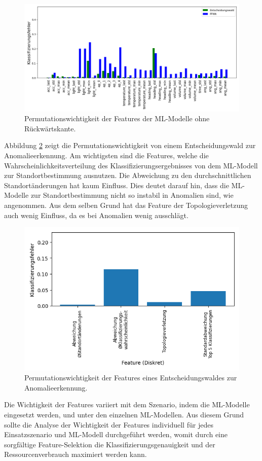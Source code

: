 \begin{figure}[h!]
    \centering
    \includegraphics[width=\linewidth]{images/fi_consolidated_wo_fb.png}
    \caption{Permutationswichtigkeit der Features der ML-Modelle ohne Rückwärtskante.}
    \label{fig:fi_consolidated_wo_fb}
\end{figure}
\newline
\newline
Abbildung \ref{fig:feature_significance_dt_anomaly} zeigt die Permutationswichtigkeit von einem Entscheidungswald zur Anomalieerkennung.
Am wichtigsten sind die Features, welche die Wahrscheinlichkeitsverteilung des Klassifizierungsergebnisses von dem ML-Modell zur Standortbestimmung ausnutzen.
Die Abweichung zu den durchschnittlichen Standortänderungen hat kaum Einfluss.
Dies deutet darauf hin, dass die ML-Modelle zur Standortbestimmung nicht so instabil in Anomalien sind, wie angenommen.
Aus dem selben Grund hat das Feature der Topologieverletzung auch wenig Einfluss, da es bei Anomalien wenig ausschlägt.
\begin{figure}[h!]
    \centering
    \includegraphics[width=0.65\linewidth]{images/fi_anomaly_dt.png}
    \caption{Permutationswichtigkeit der Features eines Entscheidungswaldes zur Anomalieerkennung.}
    \label{fig:feature_significance_dt_anomaly}
\end{figure}
\newline
\newline
Die Wichtigkeit der Features variiert mit dem Szenario, indem die ML-Modelle eingesetzt werden, und unter den einzelnen ML-Modellen.
Aus diesem Grund sollte die Analyse der Wichtigkeit der Features individuell für jedes Einsatzszenario und ML-Modell durchgeführt werden,
womit durch eine sorgfältige Feature-Selektion die Klassifizierungsgenauigkeit und der Ressourcenverbrauch maximiert werden kann.